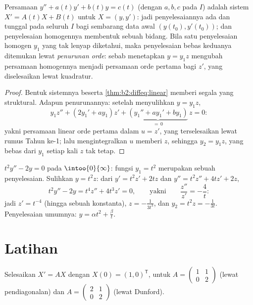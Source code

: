 \begin{proposition}\label{prop:b2:diffeq:secondorder}
Persamaan $y'' + a(t)y' + b(t)y = c(t)$ (dengan $a, b, c$  pada
$I$) adalah sistem $X' = A(t)X + B(t)$ untuk $X = (y, y')$: jadi penyelesaiannya
ada dan tunggal pada seluruh $I$ bagi sembarang data awal $(y(t_0),
y'(t_0))$; dan penyelesaian homogennya membentuk sebuah bidang. Bila satu
penyelesaian homogen $y_1$ yang tak lenyap diketahui, maka penyelesaian bebas keduanya
ditemukan lewat \emph{penurunan orde}: sebab menetapkan $y = y_1 z$ mengubah
persamaan homogennya menjadi persamaan orde pertama bagi $z'$, yang diselesaikan
lewat kuadratur.
\end{proposition}

\begin{proof}
Bentuk sistemnya beserta \cref{thm:b2:diffeq:linear} memberi segala yang
struktural. Adapun penurunannya: setelah menyulihkan $y = y_1z$,
\[
y_1 z'' + (2y_1' + a y_1)z' + \underbrace{(y_1'' + ay_1' +
by_1)}_{=\,0}\,z = 0 :
\]
yakni persamaan linear orde pertama dalam $u = z'$, yang terselesaikan lewat rumus
Tahun ke-1; lalu mengintegralkan $u$ memberi $z$, sehingga $y_2 = y_1 z$,
yang bebas dari $y_1$ setiap kali $z$ tak tetap.
\end{proof}

\begin{example}\label{ex:b2:diffeq:lowering}
$t^2y'' - 2y = 0$ pada $\intoo{0}{\infty}$: fungsi $y_1 = t^2$ merupakan sebuah
penyelesaian. Sulihkan $y = t^2z$: dari $y' = t^2z' + 2tz$ dan $y''
= t^2z'' + 4tz' + 2z$,
\[
t^2y'' - 2y = t^4 z'' + 4t^3z' = 0,
\qquad\text{yakni}\qquad \frac{z''}{z'} = -\frac4t :
\]
jadi $z' = t^{-4}$ (hingga sebuah konstanta), $z = -\frac{1}{3t^3}$, dan $y_2
= t^2z = -\frac{1}{3t}$. Penyelesaian umumnya: $y = \alpha t^2 +
\frac{\beta}{t}$.
\end{example}

\section{Latihan}

\begin{exercise}[$\star$]\label{exo:b2:diffeq:1}
Selesaikan $X' = AX$ dengan $X(0) = (1, 0)^{\mathsf T}$, untuk $A =
\begin{pmatrix} 1 & 1\\ 0 & 2\end{pmatrix}$ (lewat pendiagonalan) dan $A =
\begin{pmatrix} 2 & 1\\ 0 & 2 \end{pmatrix}$ (lewat Dunford).
\end{exercise}

